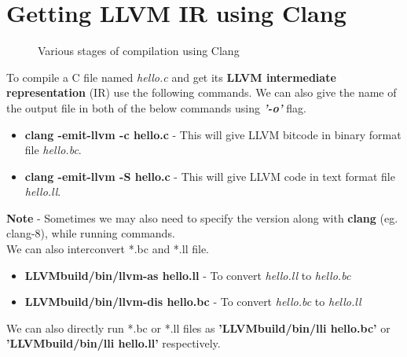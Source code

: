 \section{Getting LLVM IR using Clang}
\label{GettingLLVMIRUsingClang}

\begin{figure}[!h]
\label{fig:LLVMcompiler}
    \caption{Various stages of compilation using Clang}
\end{figure}

To compile a C file named \textit{hello.c} and get its 
\textbf{LLVM intermediate representation} (IR) use the following 
commands. We can also give the name of the output file in both of the 
below commands using \textbf{\textit{'-o'}} flag.
\begin{itemize}
    \item \textbf{clang -emit-llvm -c hello.c} - This will give LLVM 
    bitcode in binary format file \textit{hello.bc}.
    \item \textbf{clang -emit-llvm -S hello.c} - This will give LLVM 
    code in text format file \textit{hello.ll}.
\end{itemize}
\textbf{Note} - Sometimes we may also need to specify the version 
along with \textbf{clang} (eg. clang-8), while running commands.
\\
We can also interconvert *.bc and *.ll file.
\begin{itemize}
    \item \textbf{LLVMbuild/bin/llvm-as hello.ll} - To convert 
    \textit{hello.ll} to \textit{hello.bc}
    \item \textbf{LLVMbuild/bin/llvm-dis hello.bc} - To convert \textit{hello.bc} to \textit{hello.ll}
\end{itemize}
We can also directly run *.bc or *.ll files as 
\textbf{'LLVMbuild/bin/lli hello.bc'} or 
\textbf{'LLVMbuild/bin/lli hello.ll'} respectively.

